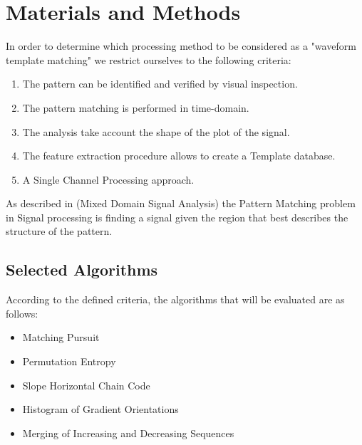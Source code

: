 \documentclass[sensors,article,submit,moreauthors,pdftex,10pt,a4paper]{mdpi}
\begin{document}
\section{Materials and Methods}


In order to determine which processing method to be considered as a  "waveform template matching" we restrict ourselves to the following criteria:

\begin{enumerate}
\item The pattern can be identified and verified by visual inspection.
\item The pattern matching is performed in time-domain.
\item The analysis take account the shape of the plot of the signal.
\item The feature extraction procedure allows to create a Template database.
\item A Single Channel Processing approach.
\end{enumerate}

As described in (Mixed Domain Signal Analysis) the Pattern Matching problem in Signal processing is finding a signal given the region that best describes the structure of the pattern.

\subsection{Selected Algorithms}

According to the defined criteria, the algorithms that will be evaluated are as follows:

\begin{itemize}
\item Matching Pursuit
\item Permutation Entropy
\item Slope Horizontal Chain Code
\item Histogram of Gradient Orientations
\item Merging of Increasing and Decreasing Sequences
\end{itemize}
\end{document}
